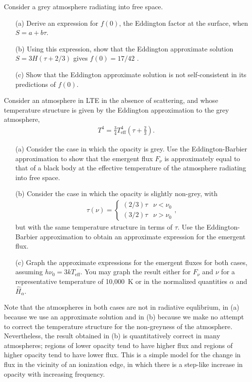 \begin{problem}
\label{problem-grey-eddington-consistency}
Consider a grey atmosphere radiating into free space.

\begin{enumerate}
\item[(a)]
Derive an expression for $f(0)$, the Eddington factor at the surface,
when $S = a + b\tau$.

\item[(b)]
Using this expression, show that the Eddington approximate solution $S= 3H(\tau + 2/3)$
gives $f(0) = 17/42$ .

\item[(c)]
Show that the Eddington approximate solution is not
self-consistent in its predictions of $f(0)$.
\end{enumerate}
\end{problem}

\begin{problem}
	Consider an atmosphere in LTE in the absence of scattering, and whose temperature structure is given by the Eddington approximation to the grey atmosphere,
	\begin{align}
		T^4 = \frac{3}{4}T_\mathrm{eff}^4(\tau + \frac{2}{3}).
	\end{align}
	\begin{itemize}
	\item[(a)] Consider the case in which the opacity is grey. Use the Eddington-Barbier approximation to show that the emergent flux $F_\nu$ is approximately equal to that of a black body at the effective temperature of the atmosphere radiating into free space.
	\item[(b)] Consider the case in which the opacity is slightly non-grey, with
	\begin{align}
		\tau(\nu) = \left\{\begin{array}{ll}(2/3)\tau&\nu < \nu_0\\(3/2)\tau&\nu > \nu_0\end{array}\right.,
	\end{align}
	but with the same temperature structure in terms of $\tau$. Use the Eddington-Barbier approximation to obtain an approximate expression for the emergent flux. 
	\item[(c)]
	Graph the approximate expressions for the emergent fluxes for both cases, assuming $h\nu_0 = 3kT_\mathrm{eff}$. You may graph the result either for $F_\nu$ and $\nu$ for a representative temperature of 10,000~K or in the normalized quantities $\alpha$ and $\hat H_\alpha$.
	\end{itemize}
	Note that the atmospheres in both cases are not in radiative equlibrium, in (a) because we use an approximate solution and in (b) because we make no attempt to correct the temperature structure for the non-greyness of the atmosphere. Nevertheless, the result obtained in (b) is quantitatively correct in many atmospheres; regions of lower opacity tend to have higher flux and regions of higher opacity tend to have lower flux. This is a simple model for the change in flux in the vicinity of an ionization edge, in which there is a step-like increase in opacity with increasing frequency.
\end{problem}

